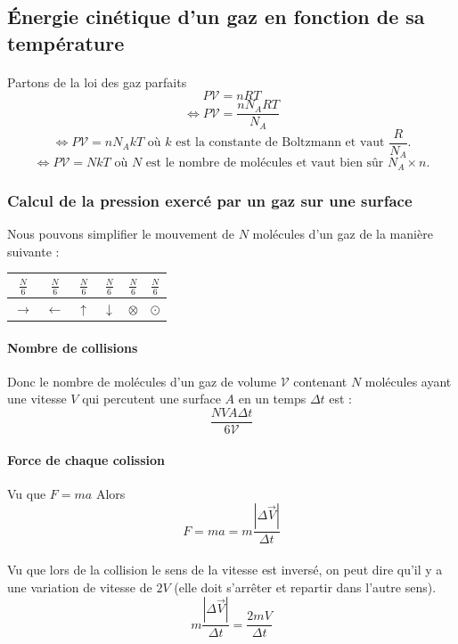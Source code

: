 \documentclass[a4paper]{article}
\begin{document}
\subsection{Énergie cinétique d'un gaz en fonction de sa température}
\paragraph{}Partons de la loi des gaz parfaits
\[P\mathscr{V}=nRT\]
\[\Leftrightarrow P\mathscr{V}=\frac{nN_ART}{N_A}\]
\[\Leftrightarrow P\mathscr{V}=nN_AkT \text{ où $k$ est la constante de Boltzmann et vaut $\frac{R}{N_A}$.}\]
\[\Leftrightarrow P\mathscr{V}=NkT \text{ où $N$ est le nombre de molécules et vaut bien sûr $N_A\times n$.}\]
\subsubsection{Calcul de la pression exercé par un gaz sur une surface}
Nous pouvons simplifier le mouvement de $N$ molécules d'un gaz de la manière suivante :
\begin{center}
\begin{tabular}{|c|c|c|c|c|c|}
\hline
$\frac{N}{6}$ & $\frac{N}{6}$ & $\frac{N}{6}$ & $\frac{N}{6}$ & $\frac{N}{6}$ & $\frac{N}{6}$ \\
\hline
$\rightarrow$ & $\leftarrow$ & $\uparrow$ & $\downarrow$ & $\otimes$ & $\odot$ \\
\hline
\end{tabular}
\end{center}
\paragraph{Nombre de collisions}Donc le nombre de molécules d'un gaz de volume $\mathscr{V}$ contenant $N$ molécules ayant une vitesse $V$ qui percutent une surface $A$ en un temps $\Delta t$ est :
\[\frac{NVA\Delta t}{6\mathscr{V}}\] 
\paragraph{Force de chaque colission}
Vu que $F=ma$ Alors
\[F=ma=m\frac{\left|\Delta\vec{V}\right|}{\Delta t}\]
\paragraph{}Vu que lors de la collision le sens de la vitesse est inversé, on peut dire qu'il y a une variation de vitesse de $2V$ (elle doit s'arrêter et repartir dans l'autre sens).
\[m\frac{\left|\Delta\vec{V}\right|}{\Delta t}=\frac{2mV}{\Delta t}\]
\end{document}
